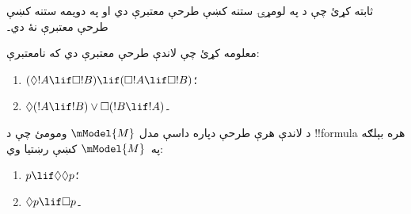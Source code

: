 \documentclass[../../../include/open-logic-section]{subfiles}
\begin{document}
\begin{prob}%
  ثابته کړئ چې د 
  په لومړۍ ستنه کښې طرحې معتبرې دي او په دويمه ستنه کښې طرحې
  معتبرې نۀ دي۔
\end{prob}

\begin{prob}
  معلومه کړئ چې لاندې طرحې معتبرې دي که نامعتبرې:
  \begin{enumerate}
  \item $(\Diamond !A \lif \Box !B) \lif (\Box !A \lif \Box
    !B)$؛
  \item $\Diamond(!A \lif !B) \lor \Box(!B \lif !A)$۔
  \end{enumerate}
\end{prob}

\begin{prob}
  د لاندې هرې طرحې دپاره داسې مدل $\mModel{M}$ ومومئ چې د
  !!{formula} هره بېلګه په~$\mModel{M}$ کښې رښتيا وي:
  \begin{enumerate}
  \item $p \lif \Diamond\Diamond p$؛
  \item $\Diamond p \lif \Box p$۔
  \end{enumerate}
\end{prob}
\end{document}
